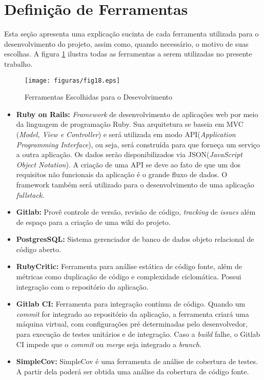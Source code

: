 \section{Definição de Ferramentas}

Esta seção apresenta uma explicação sucinta de cada ferramenta utilizada para o desenvolvimento do projeto, assim como, quando necessário, o motivo de suas escolhas. A figura \ref{fig18} ilustra todas as ferramentas a serem utilizadas no presente trabalho.

\begin{figure}[H]
	\centering
	\texttt{[image: figuras/fig18.eps]}
	\caption{Ferramentas Escolhidas para o Desevolvimento}
	\label{fig18}
\end{figure}

\begin{itemize}

  \item \textbf{Ruby on Rails:} \textit{Framework} de desenvolvimento de aplicações web por meio da linguagem de programação Ruby. Sua arquitetura se baseia em MVC (\textit{Model, View e Controller}) e será utilizada em modo API(\textit{Application Programming Interface}), ou seja, será construída para que forneça um serviço a outra aplicação. Os dados serão disponibilizados via JSON(\textit{JavaScript Object Notation}). A criação de uma API se deve ao fato de que um dos requisitos não funcionais da aplicação é o grande fluxo de dados. O framework também será utilizado para o desenvolvimento de uma aplicação \textit{fullstack}.

  \item \textbf{Gitlab:} Provê controle de versão, revisão de código, \textit{tracking} de \textit{issues} além de espaço para a criação de uma wiki do projeto.

  \item \textbf{PostgresSQL:} Sistema gerenciador de banco de dados objeto relacional de código aberto.

  \item \textbf{RubyCritic:} Ferramenta para análise estática de código fonte, além de métricas como duplicação de código e complexidade ciclomática. Possui integração com o repositório do aplicação.

	\item \textbf{Gitlab CI:} Ferramenta para integração contínua de código. Quando um \textit{commit} for integrado ao repositório da aplicação, a ferramenta criará uma máquina virtual, com configurações pré determinadas pelo desenvolvedor, para execução de testes unitários e de integração. Caso a \textit{build} falhe, o Gitlab CI impede que o \textit{commit} ou \textit{merge} seja integrado a \textit{branch}.

	\item \textbf{SimpleCov:} SimpleCov é uma ferramenta de análise de cobertura de testes. A partir dela poderá ser obtida uma análise da cobertura de código fonte.

\end{itemize}

